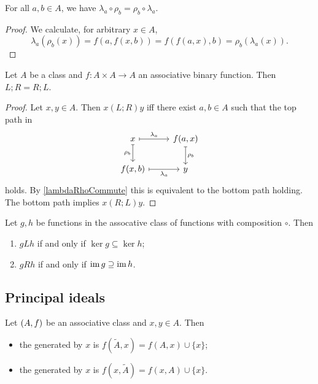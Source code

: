 \begin{lemma} \label{lambdaRhoCommute}
For all $a,b\in A$, we have $\lambda_a\circ \rho_b = \rho_b \circ \lambda_a$.
\end{lemma}
\begin{proof}
We calculate, for arbitrary $x\in A$,
\[ \lambda_a(\rho_b(x)) = f(a, f(x,b)) = f(f(a,x), b)  = \rho_b(\lambda_a(x)). \]
\end{proof}
\begin{corollary} \label{LRcommute}
Let $A$ be a class and $f: A\times A \to A$ an associative binary function. Then $L;R = R;L$.
\end{corollary}
\begin{proof}
Let $x,y\in A$. Then $x(L;R)y$ iff there exist $a,b\in A$ such that the top path in
\[ \begin{tikzcd}
x \ar[r, maps to, "\lambda_a"] \ar[d, maps to, swap, "\rho_b"] & f(a, x) \ar[d, maps to, "\rho_b"] \\
f(x, b) \ar[r, maps to, swap, "\lambda_a"] & y
\end{tikzcd} \]
holds. By \ref{lambdaRhoCommute} this is equivalent to the bottom path holding. The bottom path implies $x(R;L)y$.
\end{proof}

\begin{proposition} \label{functionsLeftRightRelations}
Let $g,h$ be functions in the assocative class of functions with composition $\circ$. Then
\begin{enumerate}
\item $gLh$ \textup{if and only if} $\ker g \subseteq \ker h$;
\item $gRh$ \textup{if and only if} $\operatorname{im} g \supseteq \operatorname{im} h$. 
\end{enumerate}
\end{proposition}

\subsection{Principal ideals}
\begin{definition}
Let $\left( A, f \right)$ be an associative class and $x, y\in A$. Then
\begin{itemize}
\item the  generated by $x$ is $f(\widetilde{A}, x) = f(A, x)\cup \{x\}$;
\item the  generated by $x$ is $f(x, \widetilde{A}) = f(x,A)\cup \{x\}$.
\end{itemize}
\end{definition}

